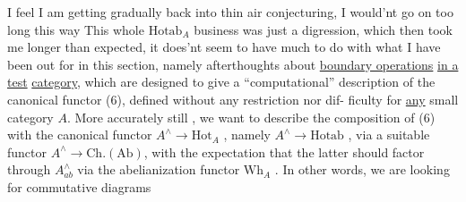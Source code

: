 I feel I am getting gradually back into thin air conjecturing,
I would'nt go on too long this way\hand{!} This  whole $\mathrm{Hotab}_{A}$ business
was just a digression, which then took me longer than expected, it
does'nt seem to have much to do with what I have been out for\unsure{*} in
this section, namely afterthoughts about \uline{boundary operations} \uline{in a test}
\uline{category}, which are designed to give a ``computational'' description
of the canonical functor (6),  defined without any restriction nor dif-%
ficulty for \uline{any} small category $A$. More accurately still , we want to
describe the composition of (6) with the canonical functor $A^{\wedge} \to \mathrm{Hot}_{A}$ ,
namely $A^{\wedge} \longrightarrow \mathrm{Hotab}$ , via a suitable functor $A^{\wedge} \longrightarrow \mathrm{Ch.(Ab)}$, with
the expectation that the latter should factor through $A^{\wedge}_{ab}$ via the
abelianization functor $\mathrm{Wh}_{A}$ . In other words, we  are looking
for commutative diagrams

